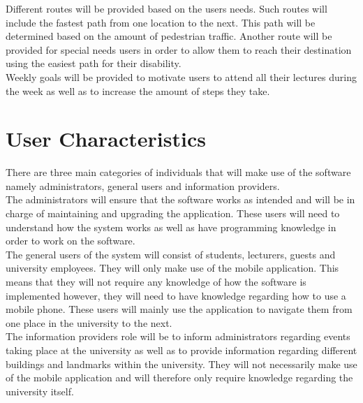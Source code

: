 \documentclass[11pt,a4paper]{report}
\begin{document}
	Different routes will be provided based on the users needs. Such routes will include the fastest path from one location to the next. This path will be determined based on the amount of pedestrian traffic. Another route will be provided for special needs users in order to allow them to reach their destination using the easiest path for their disability.
	\\

	Weekly goals will be provided to motivate users to attend all their lectures during the week as well as to increase the amount of steps they take.

	\section{User Characteristics}
	There are three main categories of individuals that will make use of the software namely administrators, general users and information providers.
	\\


	The administrators will ensure that the software works as intended and will be in charge of maintaining and upgrading the application. These users will need to understand how the system works as well as have programming knowledge in order to work on the software.
	\\

	The general users of the system will consist of students, lecturers, guests and university employees. They will only make use of the mobile application. This means that they will not require any knowledge of how the software is implemented however, they will need to have knowledge regarding how to use a mobile phone. These users will mainly use the application to navigate them 		from one place in the university to the next.
	\\

	The information providers role will be to inform administrators regarding events taking place at the university as well as to provide information regarding different buildings and landmarks within the university. They will not necessarily make use of the mobile application and will therefore only require knowledge regarding the university itself.
\end{document}
